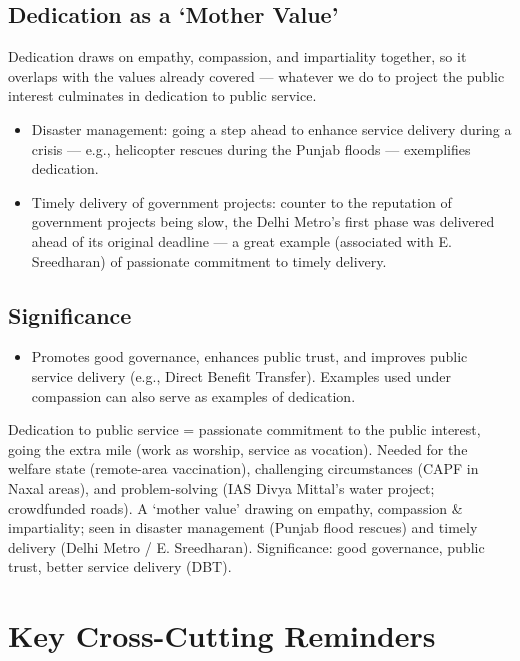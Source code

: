 \subsection{Dedication as a `Mother Value'}

Dedication draws on empathy, compassion, and impartiality together, so it overlaps with the values already covered --- whatever we do to project the public interest culminates in dedication to public service.

\begin{itemize}
\item Disaster management: going a step ahead to enhance service delivery during a crisis --- e.g., helicopter rescues during the Punjab floods --- exemplifies dedication.
\item Timely delivery of government projects: counter to the reputation of government projects being slow, the Delhi Metro's first phase was delivered ahead of its original deadline --- a great example (associated with E. Sreedharan) of passionate commitment to timely delivery.
\end{itemize}

\subsection{Significance}

\begin{itemize}
\item Promotes good governance, enhances public trust, and improves public service delivery (e.g., Direct Benefit Transfer). Examples used under compassion can also serve as examples of dedication.
\end{itemize}

\begin{QuickRevision}
Dedication to public service = passionate commitment to the public interest, going the extra mile (work as worship, service as vocation). Needed for the welfare state (remote-area vaccination), challenging circumstances (CAPF in Naxal areas), and problem-solving (IAS Divya Mittal's water project; crowdfunded roads). A `mother value' drawing on empathy, compassion \& impartiality; seen in disaster management (Punjab flood rescues) and timely delivery (Delhi Metro / E. Sreedharan). Significance: good governance, public trust, better service delivery (DBT).
\end{QuickRevision}

\section{Key Cross-Cutting Reminders}

